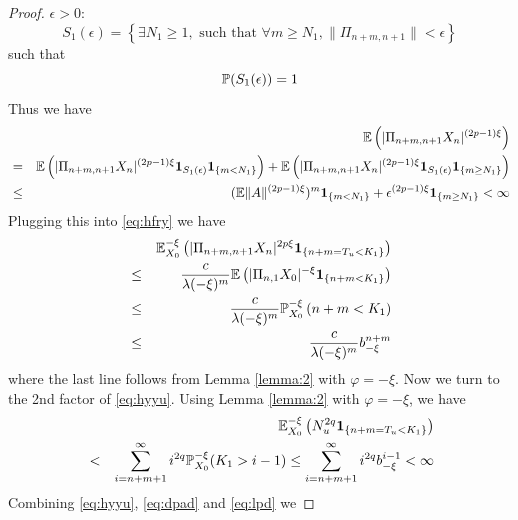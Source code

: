\documentclass[aoas,preprint]{imsart}
\numberwithin{equation}{section}
\theoremstyle{plain}
\begin{document}
\begin{proof}
  $\epsilon > 0$:
  \begin{equation}
    \label{eq:S1}
    S_1(\epsilon) = \left\{
      \exists N_1 \geq 1, \text{ such that } \forall m \geq N_1,
      \| \Pi_{n+m,n+1} \| < \epsilon
    \right\}
  \end{equation}
  such that
  \[
  \P(S_1(\epsilon)) = 1
  \]
  Thus we have
  \begin{eqnarray*}
    &&
    \E \left(
      |\Pi_{n+m,n+1} X_n|^{(2p-1)\xi}
    \right) \\
    &=&
    \E \left(
      |\Pi_{n+m,n+1} X_n|^{(2p-1)\xi}
      \I_{S_1(\epsilon)} \1{m < N_1}
    \right)
    +
    \E \left(
      |\Pi_{n+m,n+1} X_n|^{(2p-1)\xi}
      \I_{S_1(\epsilon)} \1{m \geq N_1}
    \right) \\
    &\leq&
    (\E \|A\|^{(2p - 1)\xi})^m \1{m < N_1}
    + \epsilon^{(2p-1)\xi} \1{m \geq N_1} < \infty
  \end{eqnarray*}
  Plugging this into \eqref{eq:hfry} we have
  \begin{eqnarray}
    &&
    \E_{X_0}^{-\xi} \left(
      | \Pi_{n+m,n+1} X_n|^{2 p\xi}
      \1{n+m = T_u < K_1}
    \right)  \label{eq:dpad} \\
    &\leq&
    {c \over \lambda(-\xi)^m}
    \E \left(
      |\Pi_{n,1} X_0|^{-\xi}
      \1{n + m < K_1}
    \right) \nonumber \\
    &\leq&
    {c \over \lambda(-\xi)^m}
    \P_{X_0}^{-\xi} \left(
      n + m < K_1
    \right) \nonumber \\
    &\leq&
    {c \over \lambda(-\xi)^m}
    b_{-\xi}^{n+m} \nonumber 
  \end{eqnarray}
  where the last line follows from Lemma \ref{lemma:2} with
  $\varphi = -\xi$.
  Now we turn to the 2nd factor of \eqref{eq:hyyu}. Using Lemma
  \ref{lemma:2} with $\varphi = -\xi$, we have
  \begin{eqnarray}
    &&
    \E_{X_0}^{-\xi} \left(
      N_u^{2q}
      \1{n+m = T_u < K_1}
    \right) \label{eq:lpd} \\ 
    &<&
    \sum_{i=n+m+1}^\infty
    i^{2q}
    \P_{X_0}^{-\xi} (K_1 > i - 1)
    \leq
    \sum_{i=n+m+1}^\infty
    i^{2q}
    b_{-\xi}^{i-1}
    < \infty \nonumber 
  \end{eqnarray}
  Combining \eqref{eq:hyyu}, \eqref{eq:dpad} and \eqref{eq:lpd} we

\end{proof}
\end{document}
